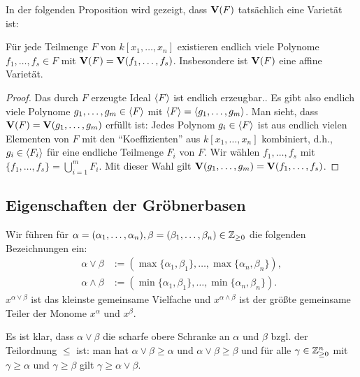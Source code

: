 \documentclass[11pt]{article}
\numberwithin{equation}{section}
\begin{document}
In der folgenden Proposition wird gezeigt, dass $\mathbf{V}(F)$ tatsächlich eine Varietät ist: 

\begin{proposition} \label{var:von:beliebig:viel:polynome}
	Für jede Teilmenge $F$ von $k[x_1,\ldots,x_n]$ existieren endlich viele Polynome $f_1,\ldots,f_s \in F$ mit $\mathbf{V}(F)= \mathbf{V}(f_1,\ldots,f_s)$. Insbesondere ist $\mathbf{V}(F)$ eine affine Varietät. 
\end{proposition} 
\begin{proof} 
	Das durch $F$ erzeugte Ideal $\left< F \right>$ ist endlich erzeugbar.. Es gibt also endlich viele Polynome $g_1,\ldots,g_m \in \left<  F \right> $ mit $\left<  F  \right> = \left<  g_1,\ldots,g_m \right>$. Man sieht, dass $\mathbf{V}(F) = \mathbf{V}(g_1,\ldots,g_m)$ erfüllt ist: 
		Jedes Polynom $g_i \in \left< F \right>$ ist  aus endlich vielen Elementen von $F$ mit den ``Koeffizienten'' aus $k[x_1,\ldots,x_n]$ kombiniert, d.h., $g_i \in \left< F_i \right>$ für eine endliche Teilmenge $F_i$ von $F$. Wir wählen $f_1,\ldots, f_s$ mit $\{f_1,\ldots,f_s\} = \bigcup_{i=1}^m F_i$. Mit dieser Wahl gilt $\mathbf{V}(g_1,\ldots,g_m) = \mathbf{V}(f_1,\ldots,f_s)$. 
\end{proof} 

\subsection{Eigenschaften der Gröbnerbasen} 

\begin{definition} 
Wir führen für $\alpha = (\alpha_1,\ldots,\alpha_n), \beta = ( \beta_1,\ldots,\beta_n) \in \mathbb{Z}_{\ge 0}$ die folgenden Bezeichnungen ein: 
\begin{align*}
		\alpha \vee \beta & := (\max  \{\alpha_1, \beta_1\},\ldots, \max \{\alpha_n,\beta_n \}),
	\\	\alpha  \wedge \beta & := (\min \{\alpha_1,\beta_1\},\ldots, \min \{\alpha_n,\beta_n\}). 
\end{align*} 
$x^{\alpha \vee \beta}$ ist das kleinste gemeinsame Vielfache und $x^{\alpha \wedge \beta}$ ist der größte gemeinsame Teiler der Monome $x^\alpha$ und $x^\beta$. 
\end{definition} 

Es ist klar, dass $\alpha \vee \beta$ die scharfe obere Schranke an $\alpha$ und $\beta$ bzgl. der Teilordnung $\le$ ist: man hat $\alpha \vee \beta \ge \alpha$ und $\alpha \vee \beta \ge \beta$ und für alle $\gamma \in \mathbb{Z}_{\ge 0}^n$ mit $\gamma \ge \alpha$ und $\gamma \ge \beta$ gilt $\gamma \ge \alpha \vee \beta$. 
\end{document}
